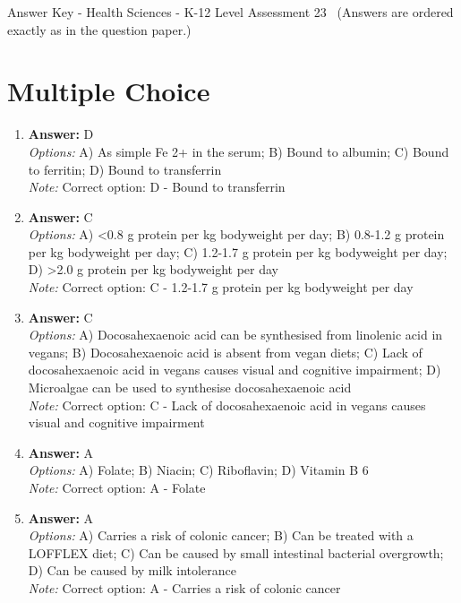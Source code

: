 \documentclass[12pt]{article}
\begin{document}
\begin{center}
Answer Key - Health Sciences - K-12 Level Assessment 23 \
\small (Answers are ordered exactly as in the question paper.)
\end{center}

\section*{Multiple Choice}
\begin{enumerate}[label=\arabic*.]
\item \textbf{Answer:} D
\\ \textit{Options:} A) As simple Fe 2+ in the serum; B) Bound to albumin; C) Bound to ferritin; D) Bound to transferrin
\\ \textit{Note:} Correct option: D - Bound to transferrin
\item \textbf{Answer:} C
\\ \textit{Options:} A) \textless{}0.8 g protein per kg bodyweight per day; B) 0.8-1.2 g protein per kg bodyweight per day; C) 1.2-1.7 g protein per kg bodyweight per day; D) \textgreater{}2.0 g protein per kg bodyweight per day
\\ \textit{Note:} Correct option: C - 1.2-1.7 g protein per kg bodyweight per day
\item \textbf{Answer:} C
\\ \textit{Options:} A) Docosahexaenoic acid can be synthesised from linolenic acid in vegans; B) Docosahexaenoic acid is absent from vegan diets; C) Lack of docosahexaenoic acid in vegans causes visual and cognitive impairment; D) Microalgae can be used to synthesise docosahexaenoic acid
\\ \textit{Note:} Correct option: C - Lack of docosahexaenoic acid in vegans causes visual and cognitive impairment
\item \textbf{Answer:} A
\\ \textit{Options:} A) Folate; B) Niacin; C) Riboflavin; D) Vitamin B 6
\\ \textit{Note:} Correct option: A - Folate
\item \textbf{Answer:} A
\\ \textit{Options:} A) Carries a risk of colonic cancer; B) Can be treated with a LOFFLEX diet; C) Can be caused by small intestinal bacterial overgrowth; D) Can be caused by milk intolerance
\\ \textit{Note:} Correct option: A - Carries a risk of colonic cancer
\end{enumerate}
\end{document}
